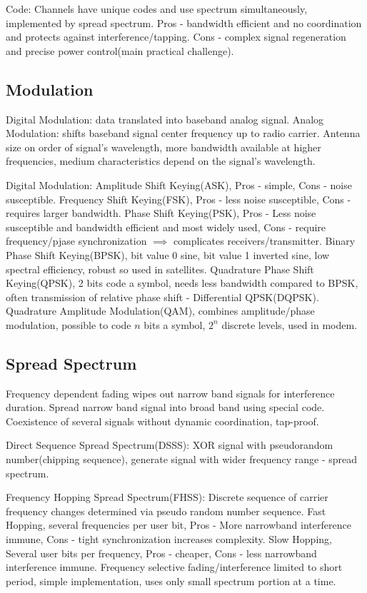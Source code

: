 \documentclass[8pt]{extarticle}
\begin{document}
\begin{multicols}{2}
Code: Channels have unique codes and use spectrum simultaneously, implemented by spread spectrum. Pros - bandwidth efficient and no coordination and protects against interference/tapping. Cons - complex signal regeneration and precise power control(main practical challenge).

\subsection{Modulation}

Digital Modulation: data translated into baseband analog signal. Analog Modulation: shifts baseband signal center frequency up to radio carrier. Antenna size on order of signal’s wavelength, more bandwidth available at higher frequencies, medium characteristics depend on the
signal’s wavelength. 

Digital Modulation: Amplitude Shift Keying(ASK), Pros - simple, Cons - noise susceptible. Frequency Shift Keying(FSK), Pros - less noise susceptible, Cons - requires larger bandwidth. Phase Shift Keying(PSK), Pros - Less noise susceptible and bandwidth efficient and most widely used, Cons - require frequency/pjase synchronization $\implies$ complicates receivers/transmitter. Binary Phase Shift Keying(BPSK), bit value 0 sine, bit value 1 inverted sine, low spectral efficiency, robust so used in satellites. Quadrature Phase Shift Keying(QPSK), 2 bits code a symbol, needs less bandwidth compared to BPSK, often transmission of relative phase shift - Differential QPSK(DQPSK). Quadrature Amplitude Modulation(QAM), combines amplitude/phase modulation, possible to code $n$ bits a symbol, $2^n$ discrete levels, used in modem.

\subsection{Spread Spectrum}

Frequency dependent fading wipes out narrow band signals
for interference duration. Spread narrow band signal into broad band using special code. Coexistence of several signals without dynamic coordination, tap-proof.

Direct Sequence Spread Spectrum(DSSS): XOR signal with pseudorandom number(chipping sequence), generate signal with wider frequency range - spread spectrum.

Frequency Hopping Spread Spectrum(FHSS): Discrete sequence of carrier frequency changes determined via pseudo random number sequence. Fast Hopping, several frequencies per user bit, Pros - More narrowband interference immune, Cons - tight synchronization increases complexity. Slow Hopping, Several user bits per frequency, Pros - cheaper, Cons - less narrowband interference immune. Frequency selective fading/interference limited to short period, simple implementation, uses only small spectrum portion at a time.


\end{multicols}
\end{document}
